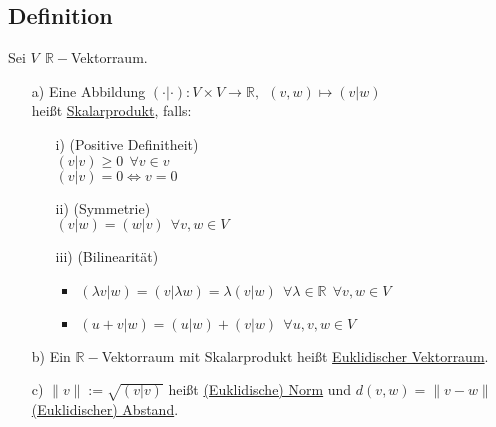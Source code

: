 \documentclass[12pt,titlepage, pdf]{article}
\newcommand{\R}{\mathds{R}}
\newcommand{\uline}[1]{\underline{#1}}
\renewcommand{\>}{\rightarrow}
\renewcommand{\*}{\cdot}
\begin{document}
\subsection{Definition}
\label{10.2}
Sei $V ~~\R-$Vektorraum.
\begin{itemize}
	\item[a)] Eine Abbildung $(\cdot | \cdot): V \times V \rightarrow \R,~~ (v,w)\mapsto (v|w)$\\
	heißt \uline{Skalarprodukt}, falls:
	\begin{itemize}
		\item[i)] (Positive Definitheit)\\
		$(v|v) \geq 0 ~~\forall v \in v$\\
		$(v|v) = 0 \Leftrightarrow v= 0$ 
		\item[ii)] (Symmetrie)\\$(v|w) = (w|v)~~ \forall v,w \in V$ 
		\item[iii)] (Bilinearität)
		\begin{itemize}
			\item $(\lambda v|w) = (v|\lambda w) = \lambda(v|w)~~ \forall \lambda \in \R ~~\forall v,w \in V$
			\item $(u+v | w) = (u|w) + (v|w) ~~\forall u,v,w \in V$
		\end{itemize}
		
	\end{itemize}
	\item[b)] Ein $\R-$Vektorraum mit Skalarprodukt heißt \uline{Euklidischer Vektorraum}.
	\item[c)] $\|v\| := \sqrt{(v|v)}$ heißt \uline{(Euklidische) Norm} und $d(v,w) = \|v -w\|$ \uline{(Euklidischer) Abstand}.
\end{itemize}
\end{document}
